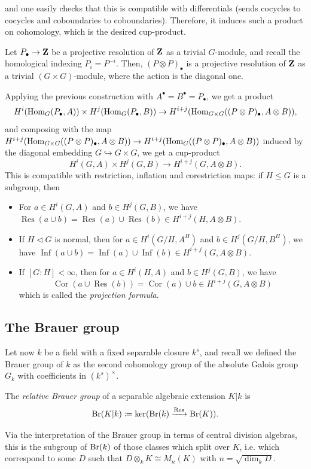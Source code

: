 \documentclass{article}
\begin{document}
\begin{constr}
\[		\]
		and one easily checks that this is compatible with differentials (sends cocycles to cocycles and coboundaries to coboundaries). Therefore, it induces such a product on cohomology, which is the desired cup-product.
		\begin{lem}
				Let $P_\bullet \to \mathbf{Z}$ be a projective resolution of $\mathbf{Z}$ as a trivial $G$-module, and recall the homological indexing $P_i=P^{-i}$. Then, $(P\otimes P)_\bullet$ is a projective resolution of $\mathbf{Z}$ as a trivial $(G\times G)$-module, where the action is the diagonal one.
		\end{lem}
		Applying the previous construction with $A^\bullet =B^\bullet = P_\bullet$, we get a product
		\[
			H^i(\operatorname{Hom}_G(P_\bullet,A))\times H^j(\operatorname{Hom}_G(P_\bullet,B)) \to H^{i+j}(\operatorname{Hom}_{G\times G}((P\otimes P)_\bullet,A\otimes B)),	
		\]
		and composing with the map $H^{i+j}(\operatorname{Hom}_{G\times G}((P\otimes P)_\bullet,A\otimes B)) \to H^{i+j}(\operatorname{Hom}_G((P\otimes P)_\bullet,A\otimes B))$ induced by the diagonal embedding $G\hookrightarrow G\times G$, we get a cup-product
		\[
			H^i(G,A)\times H^j(G,B) \to H^{i+j}(G,A\otimes B).
		\]
		This is compatible with restriction, inflation and corestriction maps: if $H\leq G$ is a subgroup, then
		\begin{itemize}
				\item For $a\in H^i(G,A)$ and $b\in H^j(G,B)$, we have $\operatorname{Res}(a\cup b) = \operatorname{Res}(a)\cup \operatorname{Res}(b) \in H^{i+j}(H,A\otimes B)$.
				\item If $H\triangleleft G$ is normal, then for $a\in H^i(G/H,A^H)$ and $b\in H^j(G/H,B^H)$, we have $\operatorname{Inf}(a\cup b) = \operatorname{Inf}(a)\cup \operatorname{Inf}(b) \in H^{i+j}(G,A\otimes B)$.
				\item If $[G:H]<\infty$, then for $a\in H^i(H,A)$ and $b\in H^j(G,B)$, we have 
				\[
					\operatorname{Cor}(a\cup \operatorname{Res}(b)) = \operatorname{Cor}(a)\cup b \in H^{i+j}(G,A\otimes B)
				\]
				which is called the \emph{projection formula}.
		\end{itemize}
\end{constr}

\subsection{The Brauer group}
Let now $k$ be a field with a fixed separable closure $k^s$, and recall we defined the Brauer group of $k$ as the second cohomology group of the absolute Galois group $G_k$ with coefficients in $(k^s)^\times$. 
\begin{defn}
		The \emph{relative Brauer group} of a separable algebraic extension $K|k$ is
		\[
			\text{Br}(K|k)\coloneqq \ker(\text{Br}(k)\xrightarrow{\operatorname{Res}} \text{Br}(K)).	
		\]
\end{defn}
Via the interpretation of the Brauer group in terms of central division algebras, this is the subgroup of $\text{Br}(k)$ of those classes which split over $K$, i.e. which correspond to some $D$ such that $D\otimes_k K \cong M_n(K)$ with $n=\sqrt{\dim_k D}$.
\end{document}
